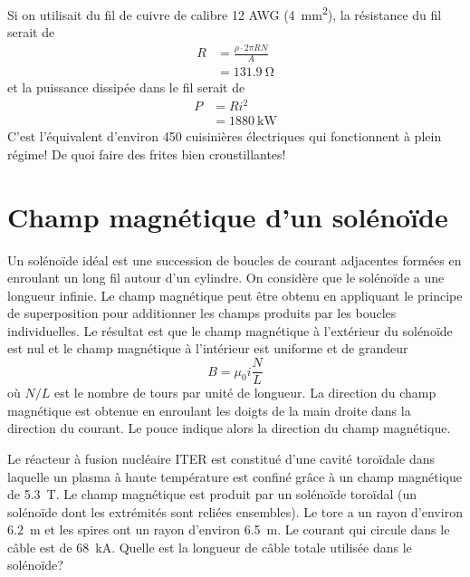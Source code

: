 \begin{reponsebox}
  Si on utilisait du fil de cuivre de calibre 12 AWG
  (\SI{4}{\milli\meter\squared}), la résistance du fil serait de
  \begin{align*}
    R &= \frac{\rho \cdot 2 \pi R N}{A}  \\
      &= \SI{131.9}{\ohm}
  \end{align*}
  et la puissance dissipée dans le fil serait de
  \begin{align*}
    P &= Ri^2  \\
      &= \SI{1880}{\kilo\watt}
  \end{align*}
  C'est l'équivalent d'environ 450 cuisinières électriques qui fonctionnent à
  plein régime! De quoi faire des frites bien croustillantes!
\end{reponsebox}


\section{Champ magnétique d'un solénoïde}


Un solénoïde idéal est une succession de boucles de courant adjacentes formées
en enroulant un long fil autour d'un cylindre. On considère que le solénoïde a
une longueur infinie. Le champ magnétique peut être obtenu en appliquant le
principe de superposition pour additionner les champs produits par les boucles
individuelles. Le résultat est que le champ magnétique à l'extérieur du
solénoïde est nul et le champ magnétique à l'intérieur est uniforme et de
grandeur
$$B = \mu_0 i \frac{N}{L}$$
où $N/L$ est le nombre de tours par unité de longueur. La direction du champ
magnétique est obtenue en enroulant les doigts de la main droite dans la
direction du courant. Le pouce indique alors la direction du champ magnétique.


\begin{diapobox}
  Le réacteur à fusion nucléaire ITER est constitué d'une cavité toroïdale dans
  laquelle un plasma à haute température est confiné grâce à un champ
  magnétique de \SI{5.3}{\tesla}. Le champ magnétique est produit par un
  solénoïde toroïdal (un solénoïde dont les extrémités sont reliées ensembles).
  Le tore a un rayon d'environ \SI{6.2}{\meter} et les spires ont un rayon
  d'environ \SI{6.5}{\meter}. Le courant qui circule dans le câble est de
  \SI{68}{\kilo\ampere}. Quelle est la longueur de câble totale utilisée dans
  le solénoïde?
\end{diapobox}

